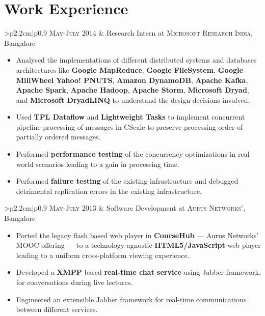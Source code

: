 \documentclass[a4paper,10pt]{article} %
\newcommand{\work}[3]{
    \begin{tabular}{>{\raggedleft}p{2.2cm}|p{0.9\linewidth}}
        \textsc{#1} & \textcolor{NavyBlue}{#2}
                    \footnotesize{#3}
    \end{tabular}
}
\begin{document}

\section{Work Experience}

\work {May-July 2014}
      {Research Intern at \textsc{Microsoft Research India}, Bangalore}
      {
         \begin{itemize}[leftmargin=*]
             \item Analysed the implementations of different distributed systems and databases architectures like
                 \textbf{Google MapReduce}, \textbf{Google FileSystem}, \textbf{Google MillWheel} \textbf{Yahoo! PNUTS},
                 \textbf{Amazon DynamoDB}, \textbf{Apache Kafka}, \textbf{Apache Spark}, \textbf{Apache Hadoop}, \textbf{Apache Storm},
                 \textbf{Microsoft Dryad}, and \textbf{Microsoft DryadLINQ} to understand the design decisions involved.
             \item Used \textbf{TPL Dataflow} and \textbf{Lightweight Tasks} to implement concurrent pipeline processing of messages in
                 CScale to preserve processing order of partially ordered messages.
             \item Performed \textbf{performance testing} of the concurrency optimizations in real world scenarios leading to a gain in processing time.
             \item Performed \textbf{failure testing} of the existing infrastructure and debugged detrimental replication errors in the
                 existing infrastructure.
         \end{itemize}
     }

\work {May-July 2013}
      {Software Development at \textsc{Aurus Networks'}, Bangalore}
      {
          \begin{itemize}[leftmargin=*]
              \item Ported the legacy flash based web player in \textbf{CourseHub} --- Aurus Networks'
                  MOOC offering --- to a technology agnostic \textbf{HTML5/JavaScript} web player leading
                  to a uniform cross-platform viewing experience.
              \item Developed a \textbf{XMPP} based \textbf{real-time chat service} using Jabber framework,
                  for conversations during live lectures.
              \item Engineered an extensible Jabber framework for real-time communications between different services.
          \end{itemize}
      }
\end{document}

